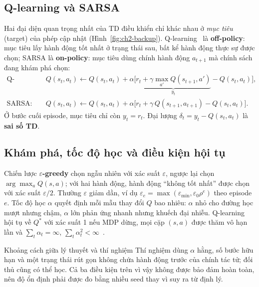 \subsection{Q-learning và SARSA}

Hai đại diện quan trọng nhất của TD điều khiển chỉ khác nhau ở \emph{mục tiêu} (target) của phép cập nhật
(Hình~\ref{fig:ch2-backup}). Q-learning~\cite{ch2:watkins} là \textbf{off-policy}: mục tiêu lấy hành động tốt nhất
ở trạng thái sau, bất kể hành động thực sự được chọn; SARSA là \textbf{on-policy}: mục tiêu dùng chính hành động
$a_{t+1}$ mà chính sách đang khám phá chọn:
\begin{align}
\text{Q-learning:}&\quad Q(s_t,a_t)\leftarrow Q(s_t,a_t)+\alpha\Big[\underbrace{r_t+\gamma\max_{a'}Q(s_{t+1},a')}_{y_t}-Q(s_t,a_t)\Big],\label{eq:ch2-q}\\
\text{SARSA:}&\quad Q(s_t,a_t)\leftarrow Q(s_t,a_t)+\alpha\big[r_t+\gamma\,Q(s_{t+1},a_{t+1})-Q(s_t,a_t)\big].\label{eq:ch2-sarsa}
\end{align}
Ở bước cuối episode, mục tiêu chỉ còn $y_t=r_t$. Đại lượng $\delta_t=y_t-Q(s_t,a_t)$ là \textbf{sai số TD}.



\subsection{Khám phá, tốc độ học và điều kiện hội tụ}

Chiến lược \textbf{$\varepsilon$-greedy} chọn ngẫu nhiên với xác suất $\varepsilon$, ngược lại chọn
$\arg\max_a Q(s,a)$; với hai hành động, hành động ``không tốt nhất'' được chọn với xác suất $\varepsilon/2$.
Thường $\varepsilon$ giảm dần, ví dụ $\varepsilon_e=\max(\varepsilon_{\min},\varepsilon_0\rho^{e})$ theo episode $e$.
Tốc độ học $\alpha$ quyết định mỗi mẫu thay đổi $Q$ bao nhiêu: $\alpha$ nhỏ cho đường học mượt nhưng chậm, $\alpha$
lớn phản ứng nhanh nhưng khuếch đại nhiễu. Q-learning hội tụ về $Q^{*}$ với xác suất 1 nếu MDP dừng, mọi cặp
$(s,a)$ được thăm vô hạn lần và $\sum_t\alpha_t=\infty$, $\sum_t\alpha_t^2<\infty$~\cite{ch2:watkins}.

\begin{luuy}{Khoảng cách giữa lý thuyết và thí nghiệm}
Thí nghiệm dùng $\alpha$ hằng, số bước hữu hạn và một trạng thái rút gọn không chứa hành động trước của chính tác tử;
đối thủ cũng có thể học. Cả ba điều kiện trên vì vậy không được bảo đảm hoàn toàn, nên độ ổn định phải được đo bằng
nhiều seed thay vì suy ra từ định lý.
\end{luuy}

